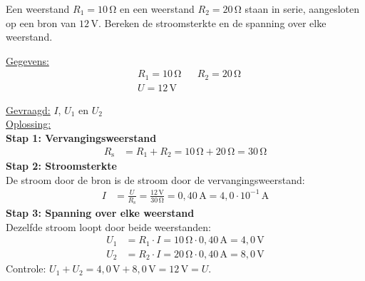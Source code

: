 \documentclass{ximera}
\begin{document}
\begin{example}[foldable=true,title={Voorbeeld: twee weerstanden in serie}]\nl
    Een weerstand $R_1 = 10\,\mathrm{\Omega}$ en een weerstand $R_2 = 20\,\mathrm{\Omega}$ staan in serie, aangesloten op een bron van $12\,\mathrm{V}$. Bereken de stroomsterkte en de spanning over elke weerstand.

    \begin{solution}\nl
        \underline{Gegevens:}
        \begin{align*}
            & R_1 = 10\,\mathrm{\Omega} & & R_2 = 20\,\mathrm{\Omega} \\
            & U = 12\,\mathrm{V} & &
        \end{align*}

        \underline{Gevraagd:} $I$, $U_1$ en $U_2$ \\

        \underline{Oplossing:}\\
        \textbf{Stap 1: Vervangingsweerstand}\\
        \begin{align*}
            R_{\text{s}} &= R_1 + R_2 = 10\,\mathrm{\Omega} + 20\,\mathrm{\Omega} = 30\,\mathrm{\Omega}
        \end{align*}
        \textbf{Stap 2: Stroomsterkte}\\
        De stroom door de bron is de stroom door de vervangingsweerstand:
        \begin{align*}
            I &= \frac{U}{R_{\text{s}}} = \frac{12\,\mathrm{V}}{30\,\mathrm{\Omega}} = 0{,}40\,\mathrm{A} = \boxed{4{,}0 \cdot 10^{-1}\,\mathrm{A}}
        \end{align*}
        \textbf{Stap 3: Spanning over elke weerstand}\\
        Dezelfde stroom loopt door beide weerstanden:
        \begin{align*}
            U_1 &= R_1 \cdot I = 10\,\mathrm{\Omega} \cdot 0{,}40\,\mathrm{A} = \boxed{4{,}0\,\mathrm{V}} \\
            U_2 &= R_2 \cdot I = 20\,\mathrm{\Omega} \cdot 0{,}40\,\mathrm{A} = \boxed{8{,}0\,\mathrm{V}}
        \end{align*}
        Controle: $U_1 + U_2 = 4{,}0\,\mathrm{V} + 8{,}0\,\mathrm{V} = 12\,\mathrm{V} = U$.
    \end{solution}
\end{example}
\end{document}
